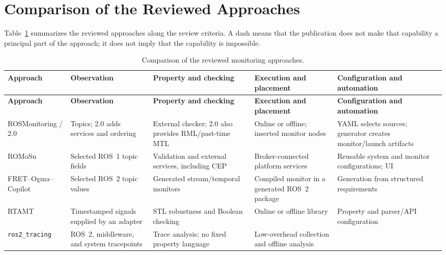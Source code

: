 \section{Comparison of the Reviewed Approaches}

Table~\ref{tab:related-work-focused} summarizes the reviewed approaches along
the review criteria. A dash means that the publication does not make that
capability a principal part of the approach; it does not imply that the
capability is impossible.

\begin{small}
\setlength{\tabcolsep}{3pt}
\begin{longtable}{
  >{\raggedright\arraybackslash}p{}
  >{\raggedright\arraybackslash}p{}
  >{\raggedright\arraybackslash}p{}
  >{\raggedright\arraybackslash}p{}
  >{\raggedright\arraybackslash}p{}}
\caption{Comparison of the reviewed monitoring approaches.}
\label{tab:related-work-focused}\\
\toprule
\textbf{Approach} & \textbf{Observation} & \textbf{Property and checking} &
\textbf{Execution and placement} & \textbf{Configuration and automation}\\
\midrule
\endfirsthead
\toprule
\textbf{Approach} & \textbf{Observation} & \textbf{Property and checking} &
\textbf{Execution and placement} & \textbf{Configuration and automation}\\
\midrule
\endhead
ROSMonitoring / 2.0 & Topics; 2.0 adds services and ordering &
External checker; 2.0 also provides RML/past-time MTL &
Online or offline; inserted monitor nodes &
YAML selects sources; generator creates monitor/launch artifacts\\
\midrule
ROMoSu & Selected ROS~1 topic fields &
Validation and external services, including CEP &
Broker-connected platform services &
Reusable system and monitor configurations; UI\\
\midrule
FRET--Ogma--Copilot & Selected ROS~2 topic values &
Generated stream/temporal monitors &
Compiled monitor in a generated ROS~2 package &
Generation from structured requirements\\
\midrule
RTAMT & Timestamped signals supplied by an adapter &
STL robustness and Boolean checking &
Online or offline library &
Property and parser/API configuration\\
\midrule
\texttt{ros2\_tracing} & ROS~2, middleware, and system tracepoints &
Trace analysis; no fixed property language &
Low-overhead collection and offline analysis &

\end{longtable}
\end{small}
